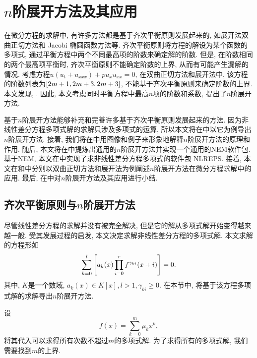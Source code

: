 \chapter{$n$阶展开方法及其应用}\label{ch04}
在微分方程的求解中, 有许多方法都是基于齐次平衡原则发展起来的, 如\Painleve{}展开法\D 双曲正切方法和 Jacobi 椭圆函数方法等. 齐次平衡原则将方程的解设为某个函数的多项式, 通过平衡方程中两个不同最高项的阶数来确定解的阶数. 但是, 在阶数相同的两个最高项平衡时, 齐次平衡原则不能确定阶数的上界, 从而有可能产生漏解的情况. 考虑方程$u(u_t+u_{xxx})+pu_x u_{xx}=0$, 在双曲正切方法和\Painleve{}展开法中, 该方程的阶数列表为$\left[2m+1,2m+3,2m+3\right]$, 不能基于齐次平衡原则来确定阶数的上界. 本文发现, . 因此, 本文考虑同时平衡方程中最高$n$项的阶数和系数, 提出了$n$阶展开方法. 

基于$n$阶展开方法能够补充和完善许多基于齐次平衡原则发展起来的方法. 因为非线性差分方程多项式解的求解只涉及多项式的运算, 所以本文将在中以它为例导出$n$阶展开方法. 接着, 我们将在中用图像和例子来形象地解释$n$阶展开方法的原理和作用. 随后, 本文将在中提炼出通用的$n$阶展开方法并实现一个通用的NEM软件包. 基于NEM, 本文在中实现了求非线性差分方程多项式的软件包 NLREPS. 接着, 本文在和中分别以双曲正切方法和\Painleve{}展开法为例阐述$n$阶展开方法在微分方程求解中的应用. 最后, 在中对$n$阶展开方法及其应用进行小结. 

\section{齐次平衡原则与$n$阶展开方法} \label{ch4sec1}
尽管线性差分方程的求解并没有被完全解决, 但是它的解从多项式解开始变得越来越一般. 受其发展过程的启发, 本文决定求解非线性差分方程的多项式解. 本文求解的方程形如
\begin{equation}
\sum_{k=0}^l{\left[a_k(x)\prod_{i=0}^r{f^{\gamma_{ki}}(x+i)}\right]}=0.
\label{eq}
\end{equation}
其中, $K$是一个数域, $a_k(x)\in K[x], l>1, \gamma_{ki}\ge 0$. 在本节中, 将基于该方程多项式解的求解导出$n$阶展开方法. 

设
\begin{equation}
f(x)=\sum_{k=0}^m{\mu_kx^k},
\label{fm1}
\end{equation}
将其代入可以求得所有次数不超过$m$的多项式解. 为了求得所有的多项式解, 我们需要找到$m$的上界.


